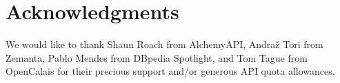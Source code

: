 \documentclass{iosart2c}
\begin{document}
\section*{Acknowledgments}
We would like to thank Shaun Roach from AlchemyAPI, Andraž Tori from Zemanta, Pablo Mendes from DBpedia Spotlight, and Tom Tague from OpenCalais for their precious support and/or generous API quota allowances. 



\end{document}
